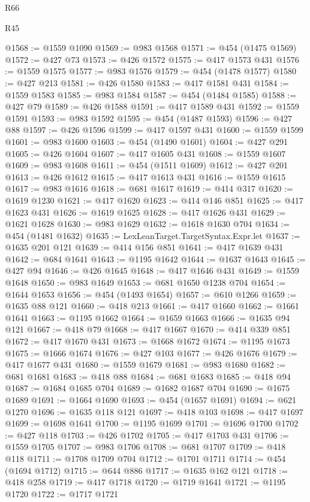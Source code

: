 \begin{lexlean}{R66}
\begin{lexlean}{R45}
\begin{coremodule}
{{{{{{{{{{{{{{{{{{{{{{{{{{{{{{{{{{{{{{{{{{{{{{{{{{{{{{{{{{{{{{{{{{{{{{{{{{{{{{{{{{{{{{{{{{{@1568 := @1559 @1090
@1569 := @983 @1568
@1571 := @454 (@1475 @1569)
@1572 := @427 @73
@1573 := @426 @1572
@1575 := @417 @1573 @431
@1576 := @1559 @1575
@1577 := @983 @1576
@1579 := @454 (@1478 @1577)
@1580 := @427 @213
@1581 := @426 @1580
@1583 := @417 @1581 @431
@1584 := @1559 @1583
@1585 := @983 @1584
@1587 := @454 (@1484 @1585)
@1588 := @427 @79
@1589 := @426 @1588
@1591 := @417 @1589 @431
@1592 := @1559 @1591
@1593 := @983 @1592
@1595 := @454 (@1487 @1593)
@1596 := @427 @88
@1597 := @426 @1596
@1599 := @417 @1597 @431
@1600 := @1559 @1599
@1601 := @983 @1600
@1603 := @454 (@1490 @1601)
@1604 := @427 @291
@1605 := @426 @1604
@1607 := @417 @1605 @431
@1608 := @1559 @1607
@1609 := @983 @1608
@1611 := @454 (@1511 @1609)
@1612 := @427 @201
@1613 := @426 @1612
@1615 := @417 @1613 @431
@1616 := @1559 @1615
@1617 := @983 @1616
@1618 := @681 @1617
@1619 := @414 @317
@1620 := @1619 @1230
@1621 := @417 @1620
@1623 := @414 @146 @851
@1625 := @417 @1623 @431
@1626 := @1619 @1625
@1628 := @417 @1626 @431
@1629 := @1621 @1628
@1630 := @983 @1629
@1632 := @1618 @1630 @704
@1634 := @454 (@1481 @1632)
@1635 := LexLeanTarget.TargetSyntax.Expr.let
@1637 := @1635 @201 @121
@1639 := @414 @156 @851
@1641 := @417 @1639 @431
@1642 := @684 @1641
@1643 := @1195 @1642
@1644 := @1637 @1643
@1645 := @427 @94
@1646 := @426 @1645
@1648 := @417 @1646 @431
@1649 := @1559 @1648
@1650 := @983 @1649
@1653 := @681 @1650 @1238 @704
@1654 := @1644 @1653
@1656 := @454 (@1493 @1654)
@1657 := @610 @1266
@1659 := @1635 @88 @121
@1660 := @418 @213
@1661 := @417 @1660
@1662 := @1661 @1641
@1663 := @1195 @1662
@1664 := @1659 @1663
@1666 := @1635 @94 @121
@1667 := @418 @79
@1668 := @417 @1667
@1670 := @414 @339 @851
@1672 := @417 @1670 @431
@1673 := @1668 @1672
@1674 := @1195 @1673
@1675 := @1666 @1674
@1676 := @427 @103
@1677 := @426 @1676
@1679 := @417 @1677 @431
@1680 := @1559 @1679
@1681 := @983 @1680
@1682 := @681 @1681
@1683 := @418 @88
@1684 := @681 @1683
@1685 := @418 @94
@1687 := @1684 @1685 @704
@1689 := @1682 @1687 @704
@1690 := @1675 @1689
@1691 := @1664 @1690
@1693 := @454 (@1657 @1691)
@1694 := @621 @1270
@1696 := @1635 @118 @121
@1697 := @418 @103
@1698 := @417 @1697
@1699 := @1698 @1641
@1700 := @1195 @1699
@1701 := @1696 @1700
@1702 := @427 @118
@1703 := @426 @1702
@1705 := @417 @1703 @431
@1706 := @1559 @1705
@1707 := @983 @1706
@1708 := @681 @1707
@1709 := @418 @118
@1711 := @1708 @1709 @704
@1712 := @1701 @1711
@1714 := @454 (@1694 @1712)
@1715 := @644 @886
@1717 := @1635 @162 @121
@1718 := @418 @258
@1719 := @417 @1718
@1720 := @1719 @1641
@1721 := @1195 @1720
@1722 := @1717 @1721
}}}}}}}}}}}}}}}}}}}}}}}}}}}}}}}}}}}}}}}}}}}}}}}}}}}}}}}}}}}}}}}}}}}}}}}}}}}}}}}}}}}}}}}}}}}
\end{coremodule}
\end{lexlean}
\end{lexlean}
